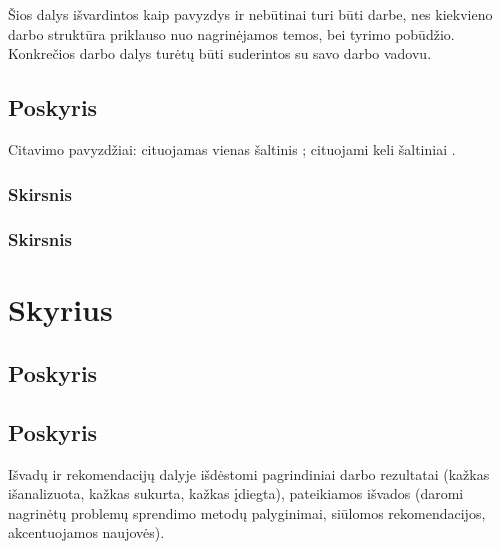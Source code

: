 \documentclass{VUMIFKompMagistrinis}
\begin{document}
Šios dalys išvardintos kaip pavyzdys ir nebūtinai turi būti darbe, nes
kiekvieno darbo struktūra priklauso nuo nagrinėjamos temos, bei tyrimo
pobūdžio. Konkrečios darbo dalys turėtų būti suderintos su savo darbo vadovu.

\subsection{Poskyris}
Citavimo pavyzdžiai: cituojamas vienas šaltinis \cite{PvzStraipsnLt}; cituojami
keli šaltiniai \cite{PvzStraipsnEn, PvzKonfLt, PvzKonfEn, PvzKnygLt, PvzKnygEn,
PvzElPubLt, PvzElPubEn, PvzMagistrLt, PvzPhdEn}.

\subsubsection{Skirsnis}
\subsubsection{Skirsnis}
\section{Skyrius}
\subsection{Poskyris}
\subsection{Poskyris}

Išvadų ir rekomendacijų dalyje išdėstomi pagrindiniai darbo rezultatai (kažkas
išanalizuota, kažkas sukurta, kažkas įdiegta), pateikiamos išvados (daromi
nagrinėtų problemų sprendimo metodų palyginimai, siūlomos rekomendacijos,
akcentuojamos naujovės).

\printbibliography[heading=bibintoc]  %

\appendix  %
\end{document}
